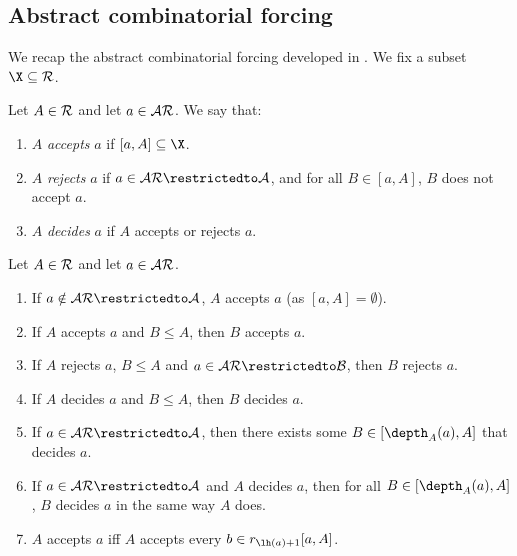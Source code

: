 \documentclass[11pt,reqno]{amsart}
\begin{document}
\subsection{Abstract combinatorial forcing}
We recap the abstract combinatorial forcing developed in \cite[\S4.3]{T10}. We fix a subset $\X \subseteq \cal{R}$.

\begin{definition}
    Let $A \in \cal{R}$ and let $a \in \cal{AR}$. We say that:
    \begin{enumerate}
        \item $A$ \emph{accepts} $a$ if $[a,A] \subseteq \X$.

        \item $A$ \emph{rejects} $a$ if $a \in \cal{AR}\restrictedto A$, and for all $B \in [a,A]$, $B$ does not accept $a$.

        \item $A$ \emph{decides} $a$ if $A$ accepts or rejects $a$.
    \end{enumerate}
\end{definition}

\begin{lemma}[{\cite[Lemma 4.31]{T10}}]
\label{lem:combinatorial.forcing.basics}
    Let $A \in \cal{R}$ and let $a \in \cal{AR}$.
    \begin{enumerate}
        \item If $a \notin\cal{AR}\restrictedto A$, $A$ accepts $a$ (as $[a,A] = \emptyset$).

        \item If $A$ accepts $a$ and $B \leq A$, then $B$ accepts $a$.

        \item If $A$ rejects $a$, $B \leq A$ and $a \in \cal{AR}\restrictedto B$, then $B$ rejects $a$.

        \item If $A$ decides $a$ and $B \leq A$, then $B$ decides $a$.

        \item If $a \in \cal{AR}\restrictedto A$, then there exists some $B \in [\depth_A(a),A]$ that decides $a$.

        \item If $a \in \cal{AR}\restrictedto A$ and $A$ decides $a$, then for all $B \in [\depth_A(a),A]$, $B$ decides $a$ in the same way $A$ does.

        \item $A$ accepts $a$ iff $A$ accepts every $b \in r_{\lh(a)+1}[a,A]$.
    \end{enumerate}
\end{lemma}
\end{document}
